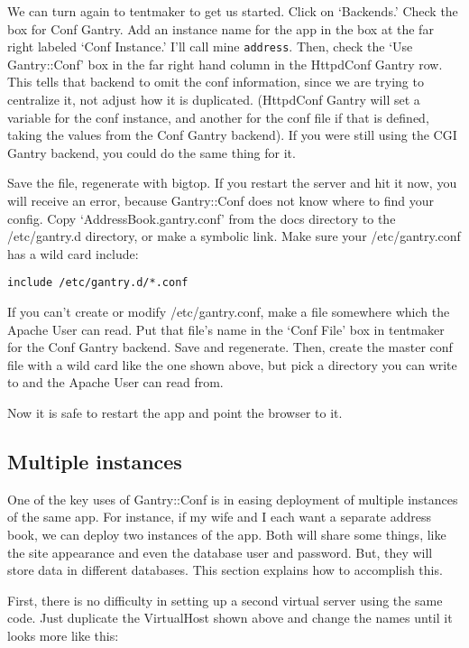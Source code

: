 We can turn again to tentmaker to get us started.  Click on `Backends.'
Check the box for Conf Gantry.  Add an instance name for the app in the
box at the far right labeled `Conf Instance.'  I'll call mine \verb+address+.
Then, check the `Use Gantry::Conf' box in the far right hand column in the
HttpdConf Gantry row.  This tells that backend to omit the conf information,
since we are trying to centralize it, not adjust how it is duplicated.
(HttpdConf Gantry will set a variable for the conf instance, and another
for the conf file if that is defined, taking the values from the Conf
Gantry backend).  If you were still using the CGI Gantry backend, you
could do the same thing for it.

Save the file, regenerate with bigtop.  If you restart the server and hit
it now, you will receive an error, because Gantry::Conf does not know where
to find your config.  Copy `AddressBook.gantry.conf' from the docs
directory to the /etc/gantry.d directory, or make a symbolic link.  Make
sure your /etc/gantry.conf has a wild card include:

\begin{verbatim}
include /etc/gantry.d/*.conf
\end{verbatim}

If you can't create or modify /etc/gantry.conf, make a file somewhere which
the Apache User can read.  Put that file's name in the `Conf File' box
in tentmaker for the Conf Gantry backend.  Save and regenerate.
Then, create the master conf file with a wild card like the one shown
above, but pick a directory you can write to and the Apache User can read
from.

Now it is safe to restart the app and point the browser to it.

\subsection{Multiple instances}

One of the key uses of Gantry::Conf is in easing deployment of multiple
instances of the same app.  For instance, if my wife and I each want a
separate address book, we can deploy two instances of the app.  Both will
share some things, like the site appearance and even the database user and
password.  But, they will store data in different databases.  This section
explains how to accomplish this.

First, there is no difficulty in setting up a second virtual server using
the same code.  Just duplicate the VirtualHost shown above and change the
names until it looks more like this:

